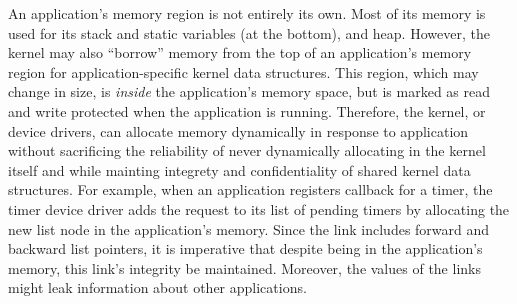 An application's memory region is not entirely its own. Most of its memory is
used for its stack and static variables (at the bottom), and heap. However,
the kernel may also ``borrow'' memory from the top of an application's memory
region for application-specific kernel data structures. This region, which may
change in size, is \emph{inside} the application's memory space, but is marked
as read and write protected when the application is running. Therefore, the
kernel, or device drivers, can allocate memory dynamically in response to
application without sacrificing the reliability of never dynamically
allocating in the kernel itself and while mainting integrety and
confidentiality of shared kernel data structures. For example, when an
application registers callback for a timer, the timer device driver adds the
request to its list of pending timers by allocating the new list node in the
application's memory. Since the link includes forward and backward list
pointers, it is imperative that despite being in the application's memory,
this link's integrity be maintained. Moreover, the values of the links might
leak information about other applications.

